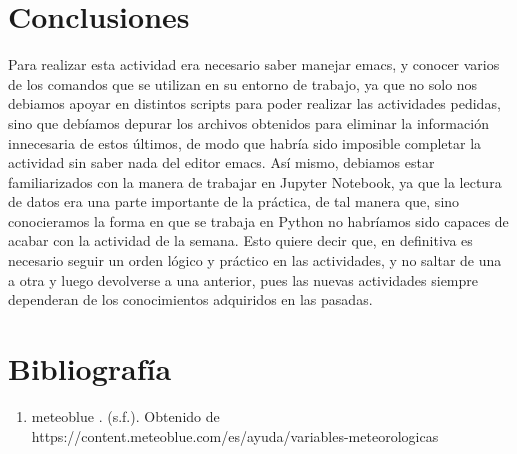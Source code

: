\documentclass{article}
\begin{document}
\section{Conclusiones}
Para realizar esta actividad era necesario saber manejar emacs, y conocer varios de los comandos que se utilizan en su entorno de trabajo, ya que no solo nos debiamos apoyar en distintos scripts para poder realizar las actividades pedidas, sino que debíamos depurar los archivos obtenidos para eliminar la información innecesaria de estos últimos, de modo que habría sido imposible completar la actividad sin saber nada del editor emacs. Así mismo, debiamos estar familiarizados con la manera de trabajar en Jupyter Notebook, ya que la lectura de datos era una parte importante de la práctica, de tal manera que, sino conocieramos la forma en que se trabaja en Python no habríamos sido capaces de acabar con la actividad de la semana. 
Esto quiere decir que, en definitiva es necesario seguir un orden lógico y práctico en las actividades, y no saltar de una a otra y luego devolverse a una anterior, pues las nuevas actividades siempre dependeran de los conocimientos adquiridos en las pasadas.  

\section{Bibliografía}
\begin{enumerate}
\item meteoblue . (s.f.). Obtenido de https://content.meteoblue.com/es/ayuda/variables-meteorologicas
\end{enumerate}
\end{document}
